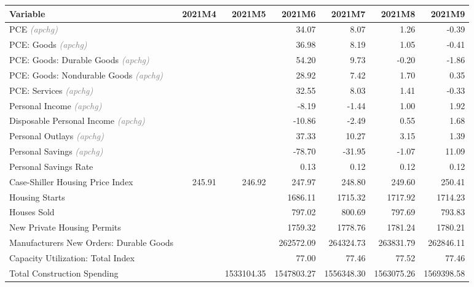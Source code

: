 \documentclass[11pt, letterpaper]{article}\usepackage[]{graphicx}\usepackage[]{color}
\begin{document}
\begin{table}[H]
\centering
\begingroup\fontsize{10pt}{12pt}\selectfont
\begin{tabular}{lrrrrrr}
  \hline
Variable & 2021M4 & 2021M5 & 2021M6 & 2021M7 & 2021M8 & 2021M9 \\ 
  \hline
PCE \textit{\footnotesize\textcolor{gray}{(apchg)}} &  &  & 34.07 & 8.07 & 1.26 & -0.39 \\ 
  PCE: Goods \textit{\footnotesize\textcolor{gray}{(apchg)}} &  &  & 36.98 & 8.19 & 1.05 & -0.41 \\ 
  PCE: Goods: Durable Goods \textit{\footnotesize\textcolor{gray}{(apchg)}} &  &  & 54.20 & 9.73 & -0.20 & -1.86 \\ 
  PCE: Goods: Nondurable Goods \textit{\footnotesize\textcolor{gray}{(apchg)}} &  &  & 28.92 & 7.42 & 1.70 & 0.35 \\ 
  PCE: Services \textit{\footnotesize\textcolor{gray}{(apchg)}} &  &  & 32.55 & 8.03 & 1.41 & -0.33 \\ 
  Personal Income \textit{\footnotesize\textcolor{gray}{(apchg)}} &  &  & -8.19 & -1.44 & 1.00 & 1.92 \\ 
  Disposable Personal Income \textit{\footnotesize\textcolor{gray}{(apchg)}} &  &  & -10.86 & -2.49 & 0.55 & 1.68 \\ 
  Personal Outlays \textit{\footnotesize\textcolor{gray}{(apchg)}} &  &  & 37.33 & 10.27 & 3.15 & 1.39 \\ 
  Personal Savings \textit{\footnotesize\textcolor{gray}{(apchg)}} &  &  & -78.70 & -31.95 & -1.07 & 11.09 \\ 
  Personal Savings Rate &  &  & 0.13 & 0.12 & 0.12 & 0.12 \\ 
  Case-Shiller Housing Price Index & 245.91 & 246.92 & 247.97 & 248.80 & 249.60 & 250.41 \\ 
  Housing Starts &  &  & 1686.11 & 1715.32 & 1717.92 & 1714.23 \\ 
  Houses Sold &  &  & 797.02 & 800.69 & 797.69 & 793.83 \\ 
  New Private Housing Permits &  &  & 1759.32 & 1778.76 & 1781.24 & 1780.21 \\ 
  Manufacturers New Orders: Durable Goods &  &  & 262572.09 & 264324.73 & 263831.79 & 262846.11 \\ 
  Capacity Utilization: Total Index &  &  & 77.00 & 77.46 & 77.52 & 77.46 \\ 
  Total Construction Spending &  & 1533104.35 & 1547803.27 & 1556348.30 & 1563075.26 & 1569398.58 \\ 

\end{tabular}
\end{table}
\end{document}
